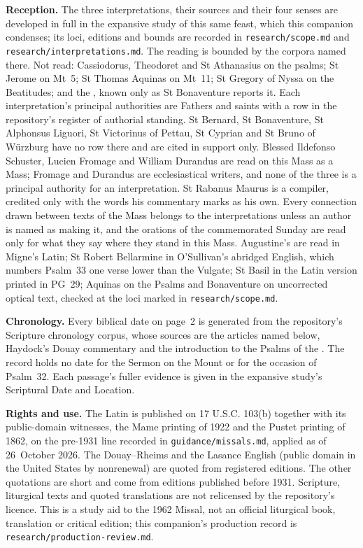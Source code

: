 {\textbf{Reception.} The three interpretations, their sources and their four
senses are developed in full in the expansive study of this same feast, which
this companion condenses; its loci, editions and bounds are recorded in
\texttt{research/scope.md} and \texttt{research/interpretations.md}. The
reading is bounded by the corpora named there. Not read: Cassiodorus,
Theodoret and St Athanasius on the psalms; St Jerome on Mt~5; St Thomas
Aquinas on Mt~11; St Gregory of Nyssa on the Beatitudes; and the
, known only as St Bonaventure reports it. Each
interpretation's principal authorities are Fathers and saints with a row in
the repository's register of authorial standing. St Bernard, St Bonaventure,
St Alphonsus Liguori, St Victorinus of Pettau, St Cyprian and St Bruno of
Würzburg have no row there and are cited in support only. Blessed Ildefonso
Schuster, Lucien Fromage and William Durandus are read on this Mass as a
Mass; Fromage and Durandus are ecclesiastical writers, and none of the three
is a principal authority for an interpretation. St Rabanus Maurus is a
compiler, credited only with the words his commentary marks as his own.
Every connection drawn between texts of the Mass belongs to the
interpretations unless an author is named as making it, and the orations of
the commemorated Sunday are read only for what they say where they stand in
this Mass. Augustine's  are read in Migne's Latin; St
Robert Bellarmine in O'Sullivan's abridged English, which numbers Psalm~33
one verse lower than the Vulgate; St Basil in the Latin version printed in
PG~29; Aquinas on the Psalms and Bonaventure on uncorrected optical text,
checked at the loci marked in \texttt{research/scope.md}.

\textbf{Chronology.} Every biblical date on page~2 is generated from the
repository's Scripture chronology corpus, whose sources are the
 articles named below, Haydock's Douay commentary
and the introduction to the Psalms of the . The record holds no date for the Sermon on the Mount or for the
occasion of Psalm~32. Each passage's fuller evidence is given in the expansive
study's Scriptural Date and Location.

\textbf{Rights and use.} The Latin is published on 17 U.S.C. 103(b) together
with its public-domain witnesses, the Mame printing of 1922 and the Pustet
printing of 1862, on the pre-1931 line recorded in \texttt{guidance/missals.md},
applied as of 26~October 2026. The Douay--Rheims and the Lasance English
(public domain in the United States by nonrenewal) are quoted from registered
editions. The other quotations are short and come from editions published
before 1931. Scripture, liturgical texts and quoted translations are not
relicensed by the repository's licence. This is a study aid to the 1962
Missal, not an official liturgical book, translation or critical edition;
this companion's production record is \texttt{research/production-review.md}.
\par}

